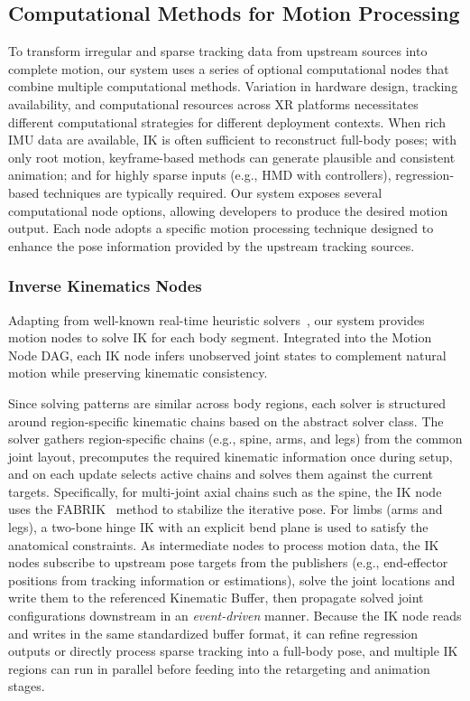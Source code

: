 \subsection{Computational Methods for Motion Processing}
\label{sec:computationalnode}

To transform irregular and sparse tracking data from upstream sources into complete motion, our system uses a series of optional computational nodes that combine multiple computational methods.
Variation in hardware design, tracking availability, and computational resources across XR platforms necessitates different computational strategies for different deployment contexts.
When rich IMU data are available, IK is often sufficient to reconstruct full-body poses; with only root motion, keyframe-based methods can generate plausible and consistent animation; and for highly sparse inputs (e.g., HMD with controllers), regression-based techniques are typically required.
Our system exposes several computational node options, allowing developers to produce the desired motion output.
Each node adopts a specific motion processing technique designed to enhance the pose information provided by the upstream tracking sources.

\subsubsection{Inverse Kinematics Nodes}
Adapting from well-known real-time heuristic solvers~\cite{aristidou2011fabrik}, our system provides motion nodes to solve IK for each body segment.
Integrated into the Motion Node DAG, each IK node infers unobserved joint states to complement natural motion while preserving kinematic consistency.

Since solving patterns are similar across body regions, each solver is structured around region-specific kinematic chains based on the abstract solver class.
The solver gathers region-specific chains (e.g., spine, arms, and legs) from the common joint layout, precomputes the required kinematic information once during setup, and on each update selects active chains and solves them against the current targets.
Specifically, for multi-joint axial chains such as the spine, the IK node uses the FABRIK~\cite{aristidou2011fabrik} method to stabilize the iterative pose.
For limbs (arms and legs), a two-bone hinge IK with an explicit bend plane is used to satisfy the anatomical constraints.
As intermediate nodes to process motion data, the IK nodes subscribe to upstream pose targets from the publishers (e.g., end-effector positions from tracking information or estimations), solve the joint locations and write them to the referenced Kinematic Buffer, then propagate solved joint configurations downstream in an \emph{event-driven} manner.
Because the IK node reads and writes in the same standardized buffer format, it can refine regression outputs or directly process sparse tracking into a full-body pose, and multiple IK regions can run in parallel before feeding into the retargeting and animation stages.


